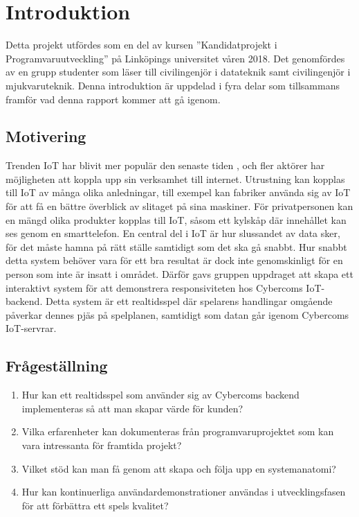\chapter{Introduktion}
\label{cha:introduction}

Detta projekt utfördes som en del av kursen ''Kandidatprojekt i Programvaruutveckling'' på Linköpings universitet våren 2018. Det genomfördes av en grupp studenter som läser till civilingenjör i datateknik samt civilingenjör i mjukvaruteknik.
Denna introduktion är uppdelad i fyra delar som tillsammans framför vad denna rapport kommer att gå igenom.

\section{Motivering}
\label{sec:motivation}
Trenden IoT har blivit mer populär den senaste tiden \cite{IoT-ecosystem}, och fler aktörer har möjligheten att koppla upp sin verksamhet till internet. Utrustning kan kopplas till IoT av många olika anledningar, till exempel kan fabriker använda sig av IoT för att få en bättre överblick av slitaget på sina maskiner. För privatpersonen kan en mängd olika produkter kopplas till IoT, såsom ett kylskåp där innehållet kan ses genom en smarttelefon. En central del i IoT är hur slussandet av data sker, för det måste hamna på rätt ställe samtidigt som det ska gå snabbt. Hur snabbt detta system behöver vara för ett bra resultat är dock inte genomskinligt för en person som inte är insatt i området. Därför gavs gruppen uppdraget att skapa ett interaktivt system för att demonstrera responsiviteten hos Cybercoms IoT-backend. Detta system är ett realtidsspel där spelarens handlingar omgående påverkar dennes pjäs på spelplanen, samtidigt som datan går igenom Cybercoms IoT-servrar.


\section{Frågeställning}

\begin{enumerate}
	\item \label{fs:fs_1} Hur kan ett realtidsspel som använder sig av Cybercoms backend implementeras så att man skapar värde för kunden?
	\item \label{fs:fs_2} Vilka erfarenheter kan dokumenteras från programvaruprojektet som kan vara intressanta för framtida projekt?
	\item \label{fs:fs_3} Vilket stöd kan man få genom att skapa och följa upp en systemanatomi?
	\item \label{fs:fs_4} Hur kan kontinuerliga användardemonstrationer användas i utvecklingsfasen för att förbättra ett spels kvalitet?

\end{enumerate}

